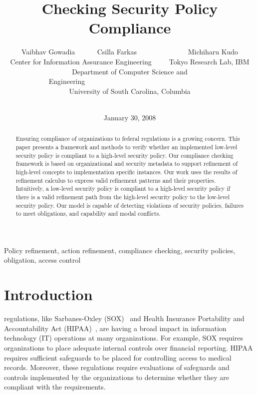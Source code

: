 \documentclass[12pt,journal,letterpaper,onecolumn]{IEEEtran}
\begin{document}
\title{Checking Security Policy Compliance}
 \begin{multicols}{2}
\author{Vaibhav Gowadia ~~~~~ Csilla Farkas  ~~~~~~~~~~~~~~Michiharu Kudo\\
       Center for Information Assurance Engineering~~~~~Tokyo Research Lab, IBM\\
     Department of Computer Science and Engineering~~~~~~~~~~~~~~~~~~~~~~~~~~~~~~~~~~~~\\
        University of South Carolina, Columbia ~~~~~~~~~~~~~~~~~~~~~~~~~~~~~~~~~~~~~\\
  }
  \end{multicols}
\date{January 30, 2008}

\maketitle 

\begin{abstract}
\noindent Ensuring compliance of organizations to federal
regulations is a growing concern. This paper presents a framework
and methods to verify whether an implemented low-level security policy is
compliant to a high-level security policy.  Our compliance checking framework
is based on organizational and security metadata to support
refinement of high-level concepts to implementation specific
instances. Our work uses the results of refinement calculus to
express valid refinement patterns and their properties.
Intuitively, a low-level security policy is compliant to a high-level security policy
if there is a valid refinement path from the high-level security policy to
the low-level security policy.  Our model is capable of detecting violations
of security policies, failures to meet obligations, and capability
and modal conflicts.
\end{abstract}

\begin{keywords}Policy refinement, action refinement, compliance checking, security policies, obligation, access control
\end{keywords}

\section{Introduction}




 regulations, like Sarbanes-Oxley (SOX)~\cite{sox} and Health
Insurance Portability and Accountability Act (HIPAA)~\cite{Hipaa96},
are having a broad impact in information technology (IT) operations
at many organizations. For example, SOX requires organizations to
place adequate internal controls over financial reporting. HIPAA
requires sufficient safeguards to be placed for controlling access
to medical records. Moreover, these regulations require evaluations
of safeguards and controls implemented by the organizations to
determine whether they are compliant with the requirements.
\end{document}
